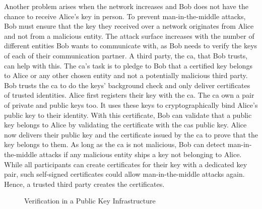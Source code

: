 Another problem arises when the network increases and Bob does not have the
chance to receive Alice's key in person. To prevent man-in-the-middle attacks,
Bob must ensure that the key they received over a network originates from Alice
and not from a malicious entity. The attack surface increases with the number of
different entities Bob wants to communicate with, as Bob needs to verify the
keys of each of their communication partner. A third party, the \gls{ca}, that
Bob trusts, can help with this. The \gls{ca}'s task is to pledge to Bob that a
certified key belongs to Alice or any other chosen entity and not a potentially
malicious third party. Bob trusts the \gls{ca} to do the keys' background check
and only deliver certificates of trusted identities. Alice first registers their
key with the \gls{ca}. The \gls{ca} own a pair of private and public keys too.
It uses these keys to cryptographically bind Alice's public key to their
identity. With this certificate, Bob can validate that a public key belongs to
Alice by validating the certificate with the \glspl{ca} public key. Alice now
delivers their public key and the certificate issued by the \gls{ca} to prove
that the key belongs to them. As long as the \gls{ca} is not malicious, Bob can
detect man-in-the-middle attacks if any malicious entity ships a key not
belonging to Alice. While all participants can create certificates for their key
with a dedicated key pair, such self-signed certificates could allow
man-in-the-middle attacks again. Hence, a trusted third party creates the
certificates.\\

\begin{figure}
  \begin{center}
    
    \caption{Verification in a Public Key Infrastructure}
    \label{fig:state:technical:chain_of_trust}
  \end{center}
\end{figure}

